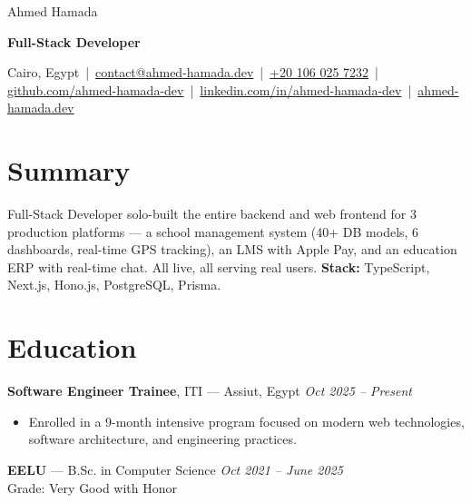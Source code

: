 \documentclass[10pt, letterpaper]{article}
\newenvironment{highlights}{
    \begin{itemize}[
        topsep=0.08cm,
        parsep=0.08cm,
        partopsep=0pt,
        itemsep=0pt,
        leftmargin=10pt
    ]
}{
    \end{itemize}
}
\begin{document}
\renewcommand{\baselinestretch}{0.95}\selectfont

\begin{center}
    {\fontsize{25pt}{15pt}\selectfont Ahmed Hamada}

    {\large \textbf{Full-Stack Developer}}

    \vspace{5pt}

    Cairo, Egypt \,|\,
    \href{mailto:dev.ahmed.hamada@gmil.com}{contact@ahmed-hamada.dev} \,|\,
    \href{tel:+201060257232}{+20 106 025 7232} \,|\,
    \href{https://github.com/ahmed-hamada-dev}{github.com/ahmed-hamada-dev} \,|\,
    \href{https://linkedin.com/in/ahmed-hamada-dev}{linkedin.com/in/ahmed-hamada-dev} \,|\,
    \href{https://ahmed-hamada.dev}{ahmed-hamada.dev}
\end{center}

\vspace{0.15cm}

\section{Summary}

Full-Stack Developer solo-built the entire backend and web frontend for 3 production platforms — a school management system (40+ DB models, 6 dashboards, real-time GPS tracking), an LMS with Apple Pay, and an education ERP with real-time chat. All live, all serving real users. \textbf{Stack:} TypeScript, Next.js, Hono.js, PostgreSQL, Prisma.


\vspace{0.15cm}


\section{Education}

\textbf{Software Engineer Trainee}, ITI — Assiut, Egypt \hfill \textit{Oct 2025 -- Present}
\begin{highlights}
    \item Enrolled in a 9-month intensive program focused on modern web technologies, software architecture, and engineering practices.
\end{highlights}

\vspace{0.08cm}

\textbf{EELU} — B.Sc. in Computer Science \hfill \textit{Oct 2021 -- June 2025} \\
Grade: Very Good with Honor
\end{document}
